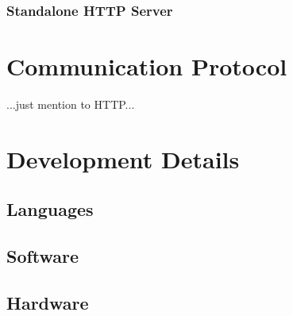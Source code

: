 \documentclass{scrreprt}
\begin{document}
\subsection{Standalone HTTP Server}



\chapter{Communication Protocol}

...just mention to HTTP...


\chapter{Development Details}

\section{Languages}
\section{Software}
\section{Hardware}
\end{document}
